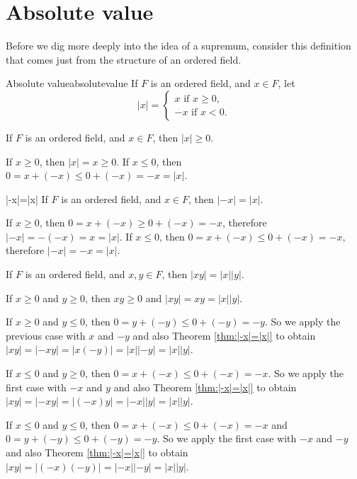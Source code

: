 \section{Absolute value}

Before we dig more deeply into the idea of a supremum, consider this definition that comes just from the structure of an ordered field.

\begin{defn}{Absolute value}{absolutevalue}
	If \(F\) is an ordered field, and \(x \in F\), let \[
		|x| =
		\begin{cases}
			x \text{\ if\ } x \geq 0\text{,} \\
			-x \text{\ if\ } x < 0\text{.}
		\end{cases}
	\]
\end{defn}

\begin{thm}{}{}
	If \(F\) is an ordered field, and \(x \in F\), then \(|x| \geq 0\).
\end{thm}

\begin{dem}{}{}
	If \(x \geq 0\), then \(|x| = x \geq 0\).
	If \(x \leq 0\), then \(0 = x + (-x) \leq 0 + (-x) = -x = |x|\).
\end{dem}

\begin{thm}{}{|-x|=|x|}
	If \(F\) is an ordered field, and \(x \in F\), then \(|-x| = |x|\).
\end{thm}

\begin{dem}{}{}
	If \(x \geq 0\), then \(0 = x + (-x) \geq 0 + (-x) = -x\), therefore \(|-x| = -(-x) = x = |x|\).
	If \(x \leq 0\), then \(0 = x + (-x) \leq 0 + (-x) = -x\), therefore \(|-x| = -x = |x|\).
\end{dem}

\begin{thm}{}{}
	If \(F\) is an ordered field, and \(x, y \in F\), then \(|xy| = |x||y|\).
\end{thm}

\begin{dem}{}{}
	If \(x \geq 0\) and \(y \geq 0\), then \(xy \geq 0\) and \(|xy| = xy = |x||y|\).

	If \(x \geq 0\) and \(y \leq 0\), then \(0 = y + (-y) \leq 0 + (-y) = -y\). So we apply the previous case with \(x\) and \(-y\) and also Theorem \ref{thm:|-x|=|x|} to obtain \(|xy| = |-xy| = |x(-y)| = |x||-y| = |x||y|\).

	If \(x \leq 0\) and \(y \geq 0\), then \(0 = x + (-x) \leq 0 + (-x) = -x\). So we apply the first case with \(-x\) and \(y\) and also Theorem \ref{thm:|-x|=|x|} to obtain \(|xy| = |-xy| = |(-x)y| = |-x||y| = |x||y|\).

	If \(x \leq 0\) and \(y \leq 0\), then \(0 = x + (-x) \leq 0 + (-x) = -x\) and \(0 = y + (-y) \leq 0 + (-y) = -y\). So we apply the first case with \(-x\) and \(-y\) and also Theorem \ref{thm:|-x|=|x|} to obtain \(|xy| = |(-x)(-y)| = |-x||-y| = |x||y|\).
\end{dem}

